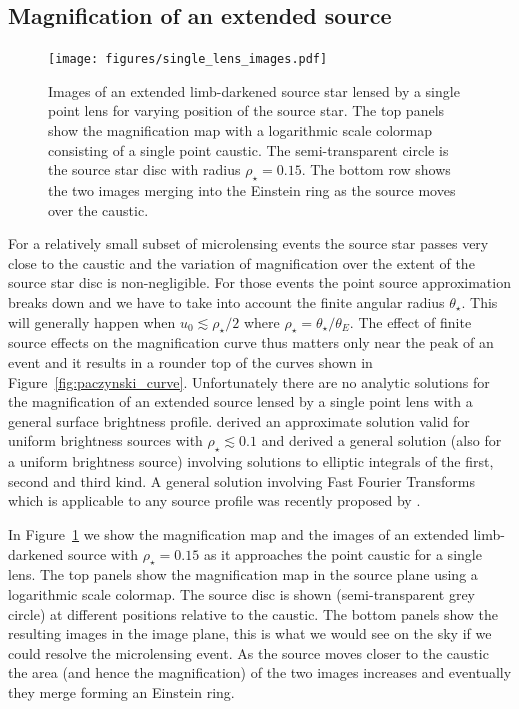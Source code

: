 \documentclass[12pt]{report}
\begin{document}
\subsection{Magnification of an extended source}
\begin{figure}[t]
    \begin{centering}
        \texttt{[image: figures/single\_lens\_images.pdf]}
        \caption{Images of an extended limb-darkened source star lensed by a single
            point lens for varying position of the source star. The top panels show the magnification map with a logarithmic scale
            colormap  consisting of a single point caustic. The semi-transparent circle
            is the source star disc with radius $\rho_\star=0.15$. The bottom row shows
            the two images merging into the Einstein ring as the source moves over the caustic.}
        \label{fig:single_lens_images}
    \end{centering}
\end{figure}
For a relatively small subset of microlensing events the source star passes
very close to the caustic and the variation of magnification over the extent of
the source star disc is non-negligible. For those events the point source
approximation breaks down and we have to take into account the finite angular
radius $\theta_\star$. This will generally happen when $u_0 \lesssim
    \rho_\star/2$ \citep{1997ApJ...477..580G} where
$\rho_\star=\theta_\star/\theta_E$. The effect of finite source effects on the
magnification curve thus matters only near the peak of an event and it results
in a rounder top of the curves shown in Figure~\ref{fig:paczynski_curve}.
Unfortunately there are no analytic solutions for the magnification of an
extended source lensed by a single point lens with a general surface brightness
profile. \citet{1994ApJ...421L..71G} derived an approximate solution valid for
uniform brightness sources with $\rho_\star\lesssim 0.1$ and
\citet{1994ApJ...430..505W} derived a general solution (also for a uniform
brightness source) involving solutions to elliptic integrals of the first,
second and third kind. A general solution involving Fast Fourier Transforms
which is applicable to any source profile was recently proposed by
\citet{2022arXiv220306637S}.

In Figure~\ref{fig:single_lens_images} we show the magnification map and the
images of an extended limb-darkened source with $\rho_\star=0.15$ as it
approaches the point caustic for a single lens. The top panels show the
magnification map in the source plane using a logarithmic scale colormap. The
source disc is shown (semi-transparent grey circle) at different positions
relative to the caustic. The bottom panels show the resulting images in the
image plane, this is what we would see on the sky if we could resolve the
microlensing event. As the source moves closer to the caustic the area (and
hence the magnification) of the two images increases and eventually they merge
forming an Einstein ring.
\end{document}
